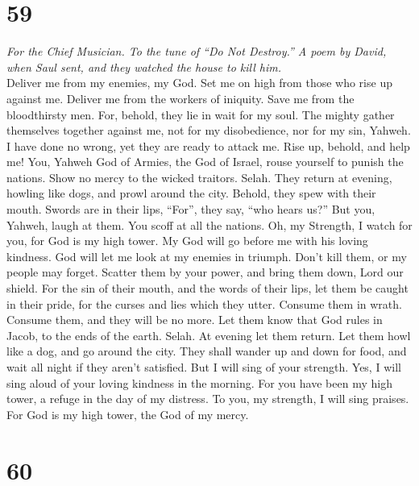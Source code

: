 \hypertarget{section-58}{%
\section{59}\label{section-58}}

\emph{For the Chief Musician. To the tune of ``Do Not Destroy.'' A poem
by David, when Saul sent, and they watched the house to kill him.}\\
 Deliver me from my enemies, my God. Set me on high from
those who rise up against me.  Deliver me from the workers
of iniquity. Save me from the bloodthirsty men.  For,
behold, they lie in wait for my soul. The mighty gather themselves
together against me, not for my disobedience, nor for my sin, Yahweh.
 I have done no wrong, yet they are ready to attack me.
Rise up, behold, and help me!  You, Yahweh God of Armies,
the God of Israel, rouse yourself to punish the nations. Show no mercy
to the wicked traitors. Selah.  They return at evening,
howling like dogs, and prowl around the city.  Behold,
they spew with their mouth. Swords are in their lips, ``For'', they say,
``who hears us?''  But you, Yahweh, laugh at them. You
scoff at all the nations.  Oh, my Strength, I watch for
you, for God is my high tower.  My God will go before me
with his loving kindness. God will let me look at my enemies in triumph.
 Don't kill them, or my people may forget. Scatter them
by your power, and bring them down, Lord our shield.  For
the sin of their mouth, and the words of their lips, let them be caught
in their pride, for the curses and lies which they utter.
 Consume them in wrath. Consume them, and they will be no
more. Let them know that God rules in Jacob, to the ends of the earth.
Selah.  At evening let them return. Let them howl like a
dog, and go around the city.  They shall wander up and
down for food, and wait all night if they aren't satisfied.
 But I will sing of your strength. Yes, I will sing aloud
of your loving kindness in the morning. For you have been my high tower,
a refuge in the day of my distress.  To you, my strength,
I will sing praises. For God is my high tower, the God of my mercy.

\hypertarget{section-59}{%
\section{60}\label{section-59}}

